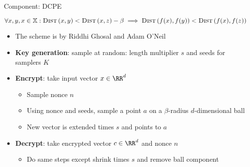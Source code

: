 	\begin{frame}{Component: DCPE}

		\[
			\forall x, y, x \in \mathbb{X} : \algo{Dist}{x, y} < \algo{Dist}{x, z} - \beta \implies \algo{Dist}{f(x), f(y)} < \algo{Dist}{f(x), f(z)}
		\]

		\begin{itemize}
			\item<1->
				The scheme is by Riddhi Ghosal and Adam O'Neil
			\item<2->
				\textbf{Key generation}: sample at random: length multiplier $s$ and seeds for samplers $K$
			\item<3->
				\textbf{Encrypt}: take input vector $x \in \RR^d$
				\begin{itemize}
					\item Sample nonce $n$
					\item Using nonce and seeds, sample a point $a$ on a $\beta$-radius $d$-dimensional ball
					\item New vector is extended times $s$ and points to $a$
				\end{itemize}
			\item<4->
				\textbf{Decrypt}: take encrypted vector $c \in \RR^d$ and nonce $n$
				\begin{itemize}
					\item Do same steps except shrink times $s$ and remove ball component
				\end{itemize}
		\end{itemize}

	\end{frame}

